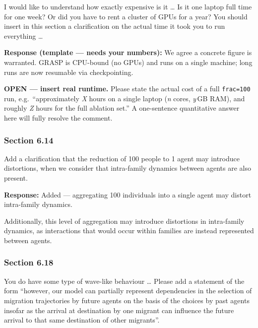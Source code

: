 \documentclass[11pt,a4paper]{article}
\begin{document}
\begin{reviewbox}
I would like to understand how exactly expensive is it \ldots{} Is it one laptop full time for one week? Or did you have to rent a cluster of GPUs for a year? You should insert in this section a clarification on the actual time it took you to run everything \ldots
\end{reviewbox}

\textbf{Response (template --- needs your numbers):} We agree a concrete figure is warranted. GRASP is CPU-bound
(no GPUs) and runs on a single machine; long runs are now resumable via checkpointing.

\vspace{0.3cm}
\begin{flagbox}
\textbf{OPEN --- insert real runtime.} Please state the actual cost of a full \texttt{frac=100} run, e.g.\
``approximately \emph{X} hours on a single laptop (\emph{n} cores, \emph{y}\,GB RAM), and roughly \emph{Z} hours
for the full ablation set.'' A one-sentence quantitative answer here will fully resolve the comment.
\end{flagbox}

\subsubsection*{Section 6.14}

\begin{reviewbox}
Add a clarification that the reduction of 100 people to 1 agent may introduce distortions, when we consider that intra-family dynamics between agents are also present.
\end{reviewbox}

\textbf{Response:} Added --- aggregating 100 individuals into a single agent may distort intra-family dynamics.

\vspace{0.3cm}
\begin{updatebox}
Additionally, this level of aggregation may introduce distortions in intra-family dynamics, as interactions that
would occur within families are instead represented between agents.
\end{updatebox}

\subsubsection*{Section 6.18}

\begin{reviewbox}
You do have some type of wave-like behaviour \ldots{} Please add a statement of the form ``however, our model can partially represent dependencies in the selection of migration trajectories by future agents on the basis of the choices by past agents insofar as the arrival at destination by one migrant can influence the future arrival to that same destination of other migrants''.
\end{reviewbox}
\end{document}
